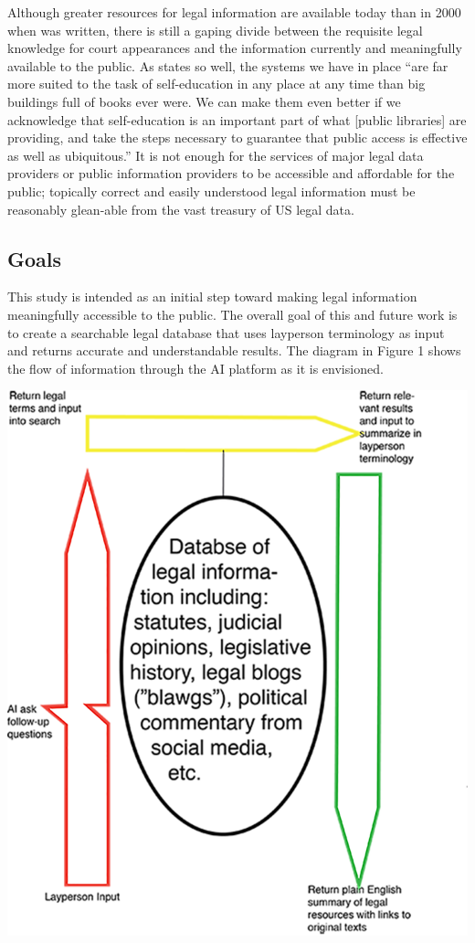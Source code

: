\documentclass[11pt]{article}
\begin{document}
Although greater resources for legal information are available today than in 2000 when \cite{Bruce2000} was written, there is still a gaping divide between the requisite legal knowledge for court appearances and the information currently and meaningfully available to the public.  As \cite{Bruce2000} states so well, the systems we have in place ``are far more suited to the task of self-education in any place at any time than big buildings full of books ever were.  We can make them even better if we acknowledge that self-education is an important part of what [public libraries] are providing, and take the steps necessary to guarantee that public access is effective as well as ubiquitous.''\cite[p.~34]{Bruce2000}    It is not enough for the services of major legal data providers or public information providers to be accessible and affordable for the public; topically correct and easily understood legal information must be reasonably glean-able from the vast treasury of US legal data. 
\subsection{Goals}
This study is intended as an initial step toward making legal information meaningfully accessible to the public.  The overall goal of this and future work is to create a searchable legal database that uses layperson terminology as input and returns accurate and understandable results.  The diagram in Figure 1 shows the flow of information through the AI platform as it is envisioned.   

\includegraphics{FigFuture}
\end{document}

